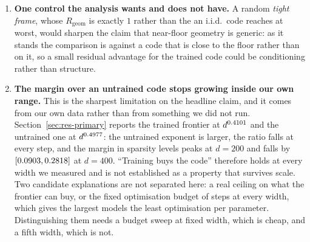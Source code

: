 \begin{enumerate}[leftmargin=*,itemsep=1pt]
\item \textbf{One control the analysis wants and does not have.} A random \emph{tight frame}, whose
$R_{\mathrm{geom}}$ is exactly $1$ rather than the \SaeCtlRgeomMax{} an i.i.d.\ code reaches at
worst, would sharpen
the claim that near-floor geometry is generic: as it stands the comparison is against a code that
is close to the floor rather than on it, so a small residual advantage for the trained code could be
conditioning rather than structure.

\item \textbf{The margin over an untrained code stops growing inside our own range.} This is the
sharpest limitation on the headline claim, and it comes from our own data rather than from something
we did not run. Section~\ref{sec:res-primary} reports the trained frontier at $d^{0.4101}$ and
the untrained one at $d^{0.4977}$: the untrained exponent is larger, the ratio falls at every
step, and the margin in sparsity levels peaks at $d=200$ and falls by \MarginDrop{}
$[0.0903,0.2818]$ at $d=400$. ``Training buys the code'' therefore holds at every
width we measured and is not established as a property that survives scale. Two candidate
explanations are not separated here: a real ceiling on what the frontier can buy, or the fixed
optimisation budget of \EsevenSteps{} steps at every width, which gives the largest models the least
optimisation per parameter. Distinguishing them needs a budget sweep at fixed width, which is cheap,
and a fifth width, which is not.
\end{enumerate}

